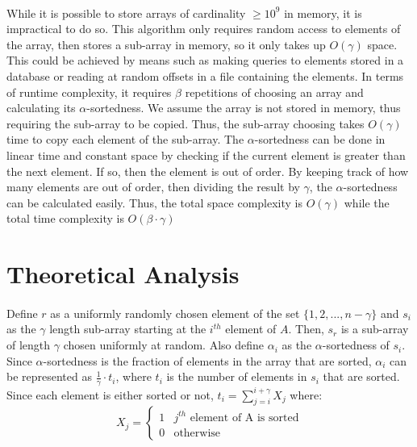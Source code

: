 \documentclass{article}
\begin{document}
\paragraph{}While it is possible to store arrays of cardinality $\geq 10^{9}$ in memory, it is impractical to do so.
 This algorithm only requires random access to elements of the array, then stores a sub-array in memory, so it only takes up $O(\gamma)$ space.
This could be achieved by means such as making queries to elements stored in a database or reading at random offsets in a file containing the elements.
In terms of runtime complexity, it requires $\beta$ repetitions of choosing an array and calculating its $\alpha$-sortedness.
 We assume the array is not stored in memory, thus requiring the sub-array to be copied. Thus, the sub-array choosing takes $O(\gamma)$ time to copy each element of the sub-array.
The $\alpha$-sortedness can be done in linear time and constant space by checking if the current element is greater than the next element.
 If so, then the element is out of order.
 By keeping track of how many elements are out of order, then dividing the result by $\gamma$, the $\alpha$-sortedness can be calculated easily.
Thus, the total space complexity is $O(\gamma)$ while the total time complexity is $O(\beta \cdot \gamma)$
\section{Theoretical Analysis}
\paragraph{}Define $r$ as a uniformly randomly chosen element of the set $\{1, 2, ..., n - \gamma\}$ and $s_{i}$ as the $\gamma$ length sub-array starting at the $i^{th}$ element of $A$.
 Then, $s_{r}$ is a sub-array of length $\gamma$ chosen uniformly at random.
 Also define $\alpha_{i}$ as the $\alpha$-sortedness of $s_{i}$.
Since $\alpha$-sortedness is the fraction of elements in the array that are sorted, $\alpha_{i}$ can be represented as $\frac{1}{\gamma} \cdot t_{i}$, where $t_{i}$ is the number of elements in $s_{i}$ that are sorted.
 Since each element is either sorted or not, $t_{i} = \sum_{j=i}^{i+\gamma}X_{j}$ where:
\[ 
X_{j} =
\begin{cases}
	1 & j^{th}\text{ element of A is sorted} \\
	0 & \text{otherwise}
\end{cases} \]
\end{document}
